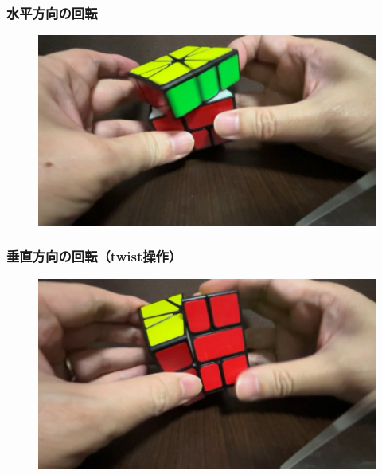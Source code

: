 \documentclass{beamer}
\begin{document}
\begin{frame}
    \frametitle{水平方向の回転}

    \begin{figure}
        \centering
        \includegraphics[width=0.96\columnwidth,height=0.54\columnwidth]{images/horizontal.jpg}
    \end{figure}
\end{frame}

\begin{frame}
    \frametitle{垂直方向の回転（twist操作）}

    \begin{figure}
        \centering
        \includegraphics[width=0.96\columnwidth,height=0.54\columnwidth]{images/vertical.jpg}
    \end{figure}
\end{frame}
\end{document}

